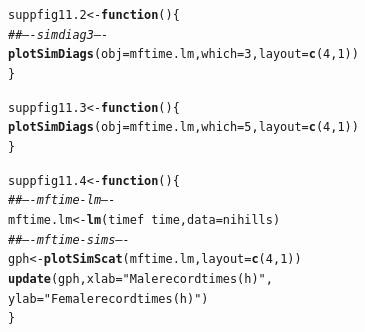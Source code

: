 \documentclass[12pt, a4paper,  BCOR=8.25mm, DIV=15]{scrartcl}\usepackage[]{graphicx}\usepackage[]{color}
\makeatletter
\newcommand{\hlnum}[1]{\textcolor[rgb]{0.686,0.059,0.569}{#1}}%
\newcommand{\hlstr}[1]{\textcolor[rgb]{0.192,0.494,0.8}{#1}}%
\newcommand{\hlcom}[1]{\textcolor[rgb]{0.678,0.584,0.686}{\textit{#1}}}%
\newcommand{\hlopt}[1]{\textcolor[rgb]{0,0,0}{#1}}%
\newcommand{\hlstd}[1]{\textcolor[rgb]{0.345,0.345,0.345}{#1}}%
\newcommand{\hlkwa}[1]{\textcolor[rgb]{0.161,0.373,0.58}{\textbf{#1}}}%
\newcommand{\hlkwb}[1]{\textcolor[rgb]{0.69,0.353,0.396}{#1}}%
\newcommand{\hlkwc}[1]{\textcolor[rgb]{0.333,0.667,0.333}{#1}}%
\newcommand{\hlkwd}[1]{\textcolor[rgb]{0.737,0.353,0.396}{\textbf{#1}}}%
\newenvironment{kframe}{%
 \def\at@end@of@kframe{}%
 \ifinner\ifhmode%
  \def\at@end@of@kframe{\end{minipage}}%
  \begin{minipage}{\columnwidth}%
 \fi\fi%
 \def\FrameCommand##1{\hskip\@totalleftmargin \hskip-\fboxsep
 \colorbox{shadecolor}{##1}\hskip-\fboxsep
     \hskip-\linewidth \hskip-\@totalleftmargin \hskip\columnwidth}%
 \MakeFramed {\advance\hsize-\width
   \@totalleftmargin\z@ \linewidth\hsize
   \@setminipage}}%
 {\par\unskip\endMakeFramed%
 \at@end@of@kframe}
\newenvironment{knitrout}{}{} %
\makeatother
\begin{document}
\begin{knitrout}
\color{fgcolor}\begin{kframe}
\begin{alltt}
\hlstd{suppfig11.2} \hlkwb{<-} \hlkwa{function}\hlstd{()\{}
\hlcom{## ---- simdiag3 ----}
\hlkwd{plotSimDiags}\hlstd{(}\hlkwc{obj}\hlstd{=mftime.lm,} \hlkwc{which}\hlstd{=}\hlnum{3}\hlstd{,} \hlkwc{layout}\hlstd{=}\hlkwd{c}\hlstd{(}\hlnum{4}\hlstd{,}\hlnum{1}\hlstd{))}
\hlstd{\}}
\end{alltt}
\end{kframe}
\end{knitrout}

\begin{knitrout}
\color{fgcolor}\begin{kframe}
\begin{alltt}
\hlstd{suppfig11.3} \hlkwb{<-} \hlkwa{function}\hlstd{()\{}
\hlkwd{plotSimDiags}\hlstd{(}\hlkwc{obj}\hlstd{=mftime.lm,} \hlkwc{which}\hlstd{=}\hlnum{5}\hlstd{,} \hlkwc{layout}\hlstd{=}\hlkwd{c}\hlstd{(}\hlnum{4}\hlstd{,}\hlnum{1}\hlstd{))}
\hlstd{\}}
\end{alltt}
\end{kframe}
\end{knitrout}

\begin{knitrout}
\color{fgcolor}\begin{kframe}
\begin{alltt}
\hlstd{suppfig11.4} \hlkwb{<-} \hlkwa{function}\hlstd{()\{}
\hlcom{## ---- mftime-lm ----}
\hlstd{mftime.lm} \hlkwb{<-} \hlkwd{lm}\hlstd{(timef} \hlopt{~} \hlstd{time,} \hlkwc{data}\hlstd{=nihills)}
\hlcom{## ---- mftime-sims ----}
\hlstd{gph} \hlkwb{<-} \hlkwd{plotSimScat}\hlstd{(mftime.lm,} \hlkwc{layout}\hlstd{=}\hlkwd{c}\hlstd{(}\hlnum{4}\hlstd{,}\hlnum{1}\hlstd{))}
\hlkwd{update}\hlstd{(gph,} \hlkwc{xlab}\hlstd{=}\hlstr{"Male record times (h)"}\hlstd{,}
       \hlkwc{ylab}\hlstd{=}\hlstr{"Female record times (h)"}\hlstd{)}
\hlstd{\}}
\end{alltt}
\end{kframe}
\end{knitrout}
\end{document}
